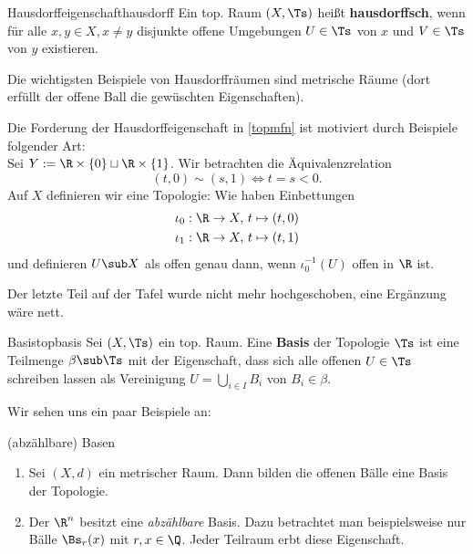 \begin{definition}{Hausdorffeigenschaft}{hausdorff}
Ein top. Raum $(X, \Ts)$ heißt \textbf{hausdorffsch}, wenn für alle $x,y \in X, x \neq y$ disjunkte offene Umgebungen $U \in \Ts$ von $x$ und $V \in \Ts$ von $y$ existieren.
\end{definition}
Die wichtigsten Beispiele von Hausdorffräumen sind metrische Räume (dort erfüllt der offene Ball die gewüschten Eigenschaften).
\begin{bemerkung}
Die Forderung der Hausdorffeigenschaft in \ref{topmfn} ist motiviert durch Beispiele folgender Art:\\
Sei $Y := \R \times \{0\} \sqcup \R \times \{1\}$. Wir betrachten die Äquivalenzrelation
\begin{equation}
(t, 0) \sim (s, 1) \iff t=s < 0.
\end{equation} 
Auf $X$ definieren wir eine Topologie: Wie haben Einbettungen
\begin{align}
\iota_0: \R \to X, \ &t \mapsto (t, 0) \\
\iota_1: \R \to X, \ &t \mapsto (t, 1)
\end{align}
und definieren $U \sub X$ als offen genau dann, wenn $\iota_0^{-1} (U)$ offen in $\R$ ist.
\end{bemerkung}
\begin{warning}
Der letzte Teil auf der Tafel wurde nicht mehr hochgeschoben, eine Ergänzung wäre nett.
\end{warning}
\begin{definition}{Basis}{topbasis}
Sei $(X, \Ts)$ ein top. Raum. Eine \textbf{Basis} der Topologie $\Ts$ ist eine Teilmenge $\beta \sub \Ts$ mit der Eigenschaft, dass sich alle offenen $U \in \Ts$ schreiben lassen als Vereinigung $U = \bigcup_{i \in I} B_i$ von $B_i \in \beta$.
\end{definition}
Wir sehen uns ein paar Beispiele an:
\begin{beispiele}{(abzählbare) Basen}
\begin{enumerate}
\item Sei $(X, d)$ ein metrischer Raum. Dann bilden die offenen Bälle eine Basis der Topologie.
\item Der $\R^n$ besitzt eine \textit{abzählbare} Basis. Dazu betrachtet man beispielsweise nur Bälle $\Bs_r(x)$ mit $r, x \in \Q$. Jeder Teilraum erbt diese Eigenschaft.
\end{enumerate}
\end{beispiele}
